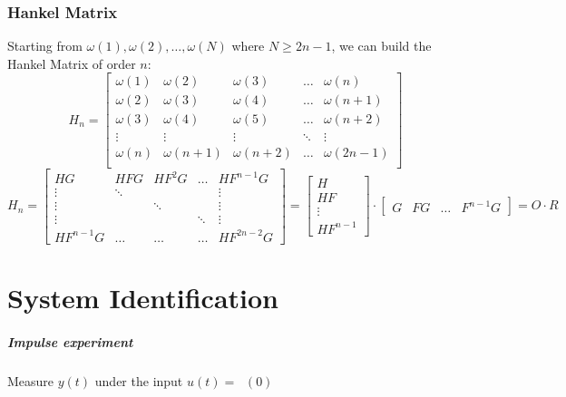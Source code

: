 \documentclass{report}
\DeclareMathOperator{\imp}{impulse(0)}
\begin{document}
\subsection{Hankel Matrix}
Starting from $\omega(1),\omega(2),\dots,\omega(N)$ where $N\geq 2n-1$, we can build the Hankel Matrix of order $n$:
\[
H_n=\begin{bmatrix}
\omega(1)&\omega(2)&\omega(3)&\dots&\omega(n)\\
\omega(2)&\omega(3)&\omega(4)&\dots&\omega(n+1)\\
\omega(3)&\omega(4)&\omega(5)&\dots&\omega(n+2)\\
\vdots&\vdots&\vdots&\ddots&\vdots\\
\omega(n)&\omega(n+1)&\omega(n+2)&\dots&\omega(2n-1)\\
\end{bmatrix}
\]
\[
H_n=
\begin{bmatrix}
HG&HFG&HF^2G&\dots&HF^{n-1}G\\
\vdots&\ddots&&&\vdots\\
\vdots&&\ddots&&\vdots\\
\vdots&&&\ddots&\vdots\\
HF^{n-1}G&\dots&\dots&\dots&HF^{2n-2}G
\end{bmatrix}
=
\begin{bmatrix}
H\\HF\\\vdots\\HF^{n-1}
\end{bmatrix}
\cdot
\begin{bmatrix}
G&FG&\dots&F^{n-1}G
\end{bmatrix}
=
O\cdot R
\]

\chapter{System Identification}
\paragraph{Impulse experiment} Measure $y(t)$ under the input $u(t)=\imp (0)$
\end{document}
